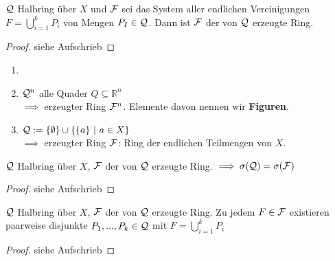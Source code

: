 \documentclass[11pt,a4paper,fleqn,openany]{report}
\begin{document}

    \begin{theorem}[i.A. II.22]
      $\mathcal{Q}$ Halbring über $X$ und $\mathcal{F}$ sei das System aller endlichen Vereinigungen $F=\bigcup\limits_{i=1}^k P_i$ von Mengen $P_I \in \mathcal{Q}$. Dann ist $\mathcal{F}$ der von $\mathcal{Q}$ erzeugte Ring.
    \end{theorem}

    \begin{proof}
      siehe Aufschrieb
    \end{proof}

    \begin{example}
      \begin{enumerate}
        \item[]
        \item $\mathcal{Q}^n$ alle Quader $Q \subseteq \mathbb{R}^n$\\
              $\implies$ erzeugter Ring $\mathcal{F}^n$. Elemente davon nennen wir \textbf{Figuren}. 
        \item $\mathcal{Q} := \{\emptyset\} \cup \{\{a\} \ | \ a \in X\}$\\
              $\implies$ erzeugter Ring $\mathcal{F}$: Ring der endlichen Teilmengen von $X$.
      \end{enumerate}
    \end{example}

    \begin{lemma}[i.A. II.23]
      $\mathcal{Q}$ Halbring über $X$, $\mathcal{F}$ der von $\mathcal{Q}$ erzeugte Ring. $\implies \sigma(\mathcal{Q}) = \sigma(\mathcal{F})$
    \end{lemma}

    \begin{proof}
      siehe Aufschrieb
    \end{proof}

    \begin{lemma}[i.A. II.24]
      $\mathcal{Q}$ Halbring über $X$, $\mathcal{F}$ der von $\mathcal{Q}$ erzeugte Ring. Zu jedem $F \in \mathcal{F}$ existieren paarweise disjunkte $P_1, ..., P_k \in \mathcal{Q}$ mit $F = \bigcup\limits_{i=1}^k P_i$
    \end{lemma}

    \begin{proof}
      siehe Aufschrieb
    \end{proof}
\end{document}
